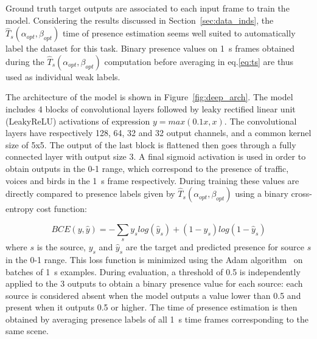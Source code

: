 \documentclass[twocolumn]{article}
\begin{document}
Ground truth target outputs are associated to each input frame to train the model. Considering the results discussed in Section~\ref{sec:data_inds}, the $\hat T_s(\alpha_{opt}, \beta_{opt})$ time of presence estimation seems well suited to automatically label the dataset for this task. Binary presence values on 1~s frames obtained during the $\hat T_s(\alpha_{opt}, \beta_{opt})$ computation before averaging in eq.\ref{eq:ts} are thus used as individual weak labels.

The architecture of the model is shown in Figure~\ref{fig:deep_arch}. The model includes 4 blocks of convolutional layers followed by leaky rectified linear unit (LeakyReLU) activations of expression $y = max(0.1x, x)$. The convolutional layers have respectively 128, 64, 32 and 32 output channels, and a common kernel size of 5x5. The output of the last block is flattened then goes through a fully connected layer with output size 3. A final sigmoid activation is used in order to obtain outputs in the 0-1 range, which correspond to the presence of traffic, voices and birds in the 1~s frame respectively. During training these values are directly compared to presence labels given by $\hat T_s(\alpha_{opt}, \beta_{opt})$ using a binary cross-entropy cost function:

\begin{equation}
BCE(y, \hat y) = -\sum_s y_s log\left(\hat y_s\right) + (1-y_s) log\left(1-\hat y_s\right)
\end{equation}
where $s$ is the source, $y_s$ and $\hat y_s$ are the target and predicted presence for source $s$ in the 0-1 range. This loss function is minimized using the Adam algorithm~\cite{kingma2015} on batches of 1~s examples. During evaluation, a threshold of 0.5 is independently applied to the 3 outputs to obtain a binary presence value for each source: each source is considered absent when the model outputs a value lower than 0.5 and present when it outputs 0.5 or higher. The time of presence estimation is then obtained by averaging presence labels of all 1~s time frames corresponding to the same scene.
\end{document}
